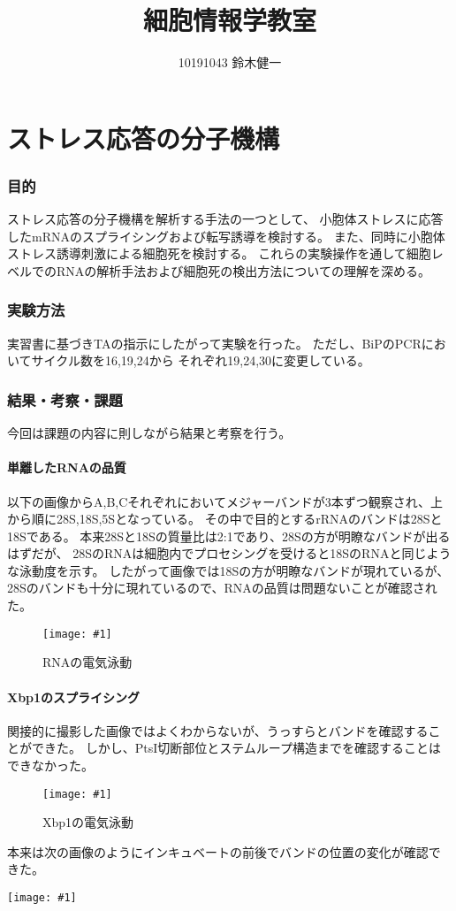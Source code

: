 \documentclass[a4paper,papersize,dvipdfmx]{jsarticle}
\newcommand{\pict}[2]{\begin{center} \texttt{[image: \#1]} \end{center}}   %
\newcommand{\piccap}[3]{\begin{figure}[H] \centering \texttt{[image: \#1]} \caption{#3} \label{fig {#1}} \end{figure}} %
\begin{document}
\title{細胞情報学教室}
\author{10191043 鈴木健一}
\date{}
\maketitle



\part*{ストレス応答の分子機構}

\section*{目的}
ストレス応答の分子機構を解析する手法の一つとして、
小胞体ストレスに応答したmRNAのスプライシングおよび転写誘導を検討する。
また、同時に小胞体ストレス誘導刺激による細胞死を検討する。
これらの実験操作を通して細胞レベルでのRNAの解析手法および細胞死の検出方法についての理解を深める。

\section*{実験方法}
実習書に基づきTAの指示にしたがって実験を行った。
ただし、BiPのPCRにおいてサイクル数を16,19,24から
それぞれ19,24,30に変更している。


\section*{結果・考察・課題}
今回は課題の内容に則しながら結果と考察を行う。

\subsection*{単離したRNAの品質}

以下の画像からA,B,Cそれぞれにおいてメジャーバンドが3本ずつ観察され、上から順に28S,18S,5Sとなっている。
その中で目的とするrRNAのバンドは28Sと18Sである。
本来28Sと18Sの質量比は2:1であり、28Sの方が明瞭なバンドが出るはずだが、
28SのRNAは細胞内でプロセシングを受けると18SのRNAと同じような泳動度を示す。
したがって画像では18Sの方が明瞭なバンドが現れているが、
28Sのバンドも十分に現れているので、RNAの品質は問題ないことが確認された。

\piccap{images/rna.jpg}{7}{RNAの電気泳動}


\subsection*{Xbp1のスプライシング}
関接的に撮影した画像ではよくわからないが、うっすらとバンドを確認することができた。
しかし、PtsI切断部位とステムループ構造までを確認することはできなかった。
\piccap{images/xbp1.jpg}{7}{Xbp1の電気泳動}
本来は次の画像のようにインキュベートの前後でバンドの位置の変化が確認できた。
\pict{images/good_xbp1.jpg}{7}
\end{document}
